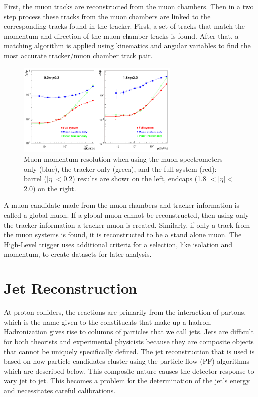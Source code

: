First, the muon tracks are reconstructed from the muon chambers. Then in a two step process these tracks from the muon chambers are linked to the corresponding tracks found in the tracker.  First, a set of tracks that match the momentum and direction of the muon chamber tracks is found.  After that, a matching algorithm is applied using kinematics and angular variables to find the most accurate tracker/muon chamber track pair.

\begin{figure}[htb]
\centering
\includegraphics[width=0.69\textwidth]{Reconstruction/muon_Pandolfi.pdf}
\caption{Muon momentum resolution when using the muon spectrometers only (blue), the tracker only (green), and the full system (red): barrel ($|\eta| < $0.2) results are shown on the left, endcaps (1.8 $< |\eta| <$ 2.0) on the right.~\cite{Pandolfi_thesis}}
\label{fig:muon_pandolfi}
\end{figure}

A muon candidate made from the muon chambers and tracker information is called a global muon. If a global muon cannot be reconstructed, then using only the tracker information a tracker muon is created.  Similarly, if only a track from the muon systems is found, it is reconstructed to be a stand alone muon. The High-Level trigger uses additional criteria for a selection, like isolation and momentum, to create datasets for later analysis.

\section{Jet Reconstruction}

At proton colliders, the reactions are primarily from the interaction of partons, which is the name given to the constituents that make up a hadron. Hadronization gives rise to columns of particles that we call jets. Jets are difficult for both theorists and experimental physicists because they are composite objects that cannot be uniquely specifically defined.  The jet reconstruction that is used is based on how particle candidates cluster using the particle flow (PF) algorithms which are described below.  This composite nature causes the detector response to vary jet to jet. This becomes a problem for the determination of the jet's energy and necessitates careful calibrations.

